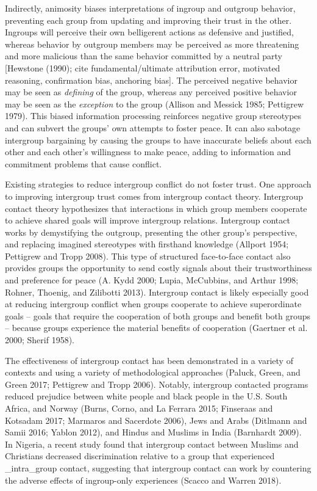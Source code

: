 \documentclass[11pt]{article}
\begin{document}
Indirectly, animosity biases interpretations of ingroup and outgroup
behavior, preventing each group from updating and improving their trust
in the other. Ingroups will perceive their own belligerent actions as
defensive and justified, whereas behavior by outgroup members may be
perceived as more threatening and more malicious than the same behavior
committed by a neutral party {[}Hewstone (1990); cite
fundamental/ultimate attribution error, motivated reasoning,
confirmation bias, anchoring bias{]}. The perceived negative behavior
may be seen as \emph{defining} of the group, whereas any perceived
positive behavior may be seen as the \emph{exception} to the group
(Allison and Messick 1985; Pettigrew 1979). This biased information
processing reinforces negative group stereotypes and can subvert the
groups' own attempts to foster peace. It can also sabotage intergroup
bargaining by causing the groups to have inaccurate beliefs about each
other and each other's willingness to make peace, adding to information
and commitment problems that cause conflict.

Existing strategies to reduce intergroup conflict do not foster trust.
One approach to improving intergroup trust comes from intergroup contact
theory. Intergroup contact theory hypothesizes that interactions in
which group members cooperate to achieve shared goals will improve
intergroup relations. Intergroup contact works by demystifying the
outgroup, presenting the other group's perspective, and replacing
imagined stereotypes with firsthand knowledge (Allport 1954; Pettigrew
and Tropp 2008). This type of structured face-to-face contact also
provides groups the opportunity to send costly signals about their
trustworthiness and preference for peace (A. Kydd 2000; Lupia,
McCubbins, and Arthur 1998; Rohner, Thoenig, and Zilibotti 2013).
Intergroup contact is likely especially good at reducing intergroup
conflict when groups cooperate to achieve superordinate goals -- goals
that require the cooperation of both groups and benefit both groups --
because groups experience the material benefits of cooperation (Gaertner
et al. 2000; Sherif 1958).

The effectiveness of intergroup contact has been demonstrated in a
variety of contexts and using a variety of methodological approaches
(Paluck, Green, and Green 2017; Pettigrew and Tropp 2006). Notably,
intergroup contacted programs reduced prejudice between white people and
black people in the U.S. South Africa, and Norway (Burns, Corno, and La
Ferrara 2015; Finseraas and Kotsadam 2017; Marmaros and Sacerdote 2006),
Jews and Arabs (Ditlmann and Samii 2016; Yablon 2012), and Hindus and
Muslims in India (Barnhardt 2009). In Nigeria, a recent study found that
intergroup contact between Muslims and Christians decreased
discrimination relative to a group that experienced \_intra\_group
contact, suggesting that intergroup contact can work by countering the
adverse effects of ingroup-only experiences (Scacco and Warren 2018).
\end{document}

